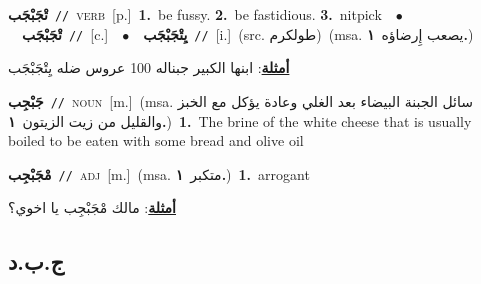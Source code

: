 \documentclass[10pt,a4paper,twoside]{article} %
\begin{document}
\begin{multicols}{2}
{\setlength\topsep{0pt}\textbf{\foreignlanguage{arabic}{تْجَبْجَب}}\ {\color{gray}\texttt{//}\color{black}}\ \textsc{verb}\ [p.]\ \textbf{1.}~be fussy.  \textbf{2.}~be fastidious.  \textbf{3.}~nitpick\ \ $\bullet$\ \ \setlength\topsep{0pt}\textbf{\foreignlanguage{arabic}{تْجَبْجَب}}\ {\color{gray}\texttt{//}\color{black}}\ [c.]\ \ $\bullet$\ \ \setlength\topsep{0pt}\textbf{\foreignlanguage{arabic}{يِتْجَبْجَب}}\ {\color{gray}\texttt{//}\color{black}}\ [i.]\ (src. \color{gray}\foreignlanguage{arabic}{طولكرم}\color{black})\ \color{gray}(msa. \foreignlanguage{arabic}{يصعب إِرضاؤه}~\foreignlanguage{arabic}{\textbf{١.}})\color{black}\  \begin{flushright}\color{gray}\foreignlanguage{arabic}{\textbf{\underline{\foreignlanguage{arabic}{أمثلة}}}: ابنها الكبير جبناله 100 عروس ضله يِتْجَبْجَب}\end{flushright}\color{black}} \vspace{2mm}

{\setlength\topsep{0pt}\textbf{\foreignlanguage{arabic}{جَبْجِب}}\ {\color{gray}\texttt{//}\color{black}}\ \textsc{noun}\ [m.]\ \color{gray}(msa. \foreignlanguage{arabic}{سائل الجبنة البيضاء بعد الغلي وعادة يؤكل مع الخبز والقليل من زيت الزيتون}~\foreignlanguage{arabic}{\textbf{١.}})\color{black}\ \textbf{1.}~The brine of the white cheese that is usually boiled to be eaten with some bread and olive oil\ } \vspace{2mm}

{\setlength\topsep{0pt}\textbf{\foreignlanguage{arabic}{مْجَبْجِب}}\ {\color{gray}\texttt{//}\color{black}}\ \textsc{adj}\ [m.]\ \color{gray}(msa. \foreignlanguage{arabic}{متكبر}~\foreignlanguage{arabic}{\textbf{١.}})\color{black}\ \textbf{1.}~arrogant\  \begin{flushright}\color{gray}\foreignlanguage{arabic}{\textbf{\underline{\foreignlanguage{arabic}{أمثلة}}}: مالك مْجَبْجِب يا اخوي؟}\end{flushright}\color{black}} \vspace{2mm}

\vspace{-3mm}
\subsection*{\color{blue}\foreignlanguage{arabic}{ج.ب.د}\color{blue}{}} 


\end{multicols}
\end{document}
